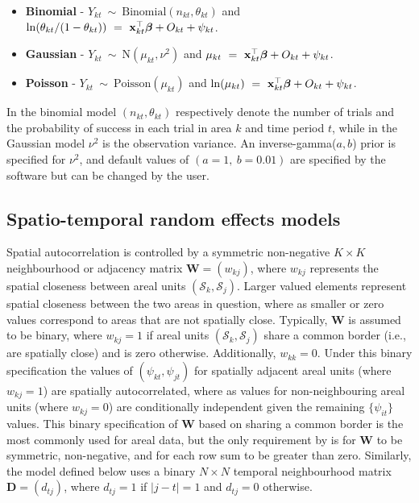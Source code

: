 \documentclass[article, nojss]{jss}
\newcommand{\bd}[1]{\ensuremath{\mbox{\boldmath $#1$}}}
\begin{document}
\begin{itemize}
\item \textbf{Binomial} -  $Y_{kt}~\sim~\mbox{Binomial}(n_{kt}, \theta_{kt})$ and $\ln(\theta_{kt}/(1-\theta_{kt}))~=~\mathbf{x}_{kt}^{\top}\bd{\beta} + O_{kt} + \psi_{kt}$. 

\item \textbf{Gaussian} -  $Y_{kt}~\sim~\mbox{N}(\mu_{kt}, \nu^{2})$ and $\mu_{kt}~=~\mathbf{x}_{kt}^{\top}\bd{\beta} + O_{kt} + \psi_{kt}$. 

\item \textbf{Poisson} -  $Y_{kt}~\sim~\mbox{Poisson}(\mu_{kt})$ and $\ln(\mu_{kt})~=~\mathbf{x}_{kt}^{\top}\bd{\beta} + O_{kt} + \psi_{kt}$. 
\end{itemize}

In the binomial model $(n_{kt}, \theta_{kt})$ respectively denote the number of trials and the probability of success in each trial in area $k$ and time period $t$, while in the Gaussian model $\nu^2$ is the observation variance. An inverse-gamma($a,b$) prior is specified for $\nu^2$, and default values of $(a=1,~ b=0.01)$  are specified by the software but can be changed by the user.


\subsection{Spatio-temporal random effects models}\label{section2.2}
Spatial autocorrelation is controlled by a symmetric non-negative $K\times K$ neighbourhood or adjacency matrix $\mathbf{W}=(w_{kj})$, where $w_{kj}$ represents the spatial closeness between areal units $(\mathcal{S}_k, \mathcal{S}_j)$. Larger valued elements represent spatial closeness between the two areas in question, where as smaller or zero values correspond to areas that are not spatially close. Typically, $\mathbf{W}$ is assumed to be binary, where $w_{kj}=1$ if areal units $(\mathcal{S}_k, \mathcal{S}_j)$ share a common border (i.e., are spatially close) and is zero otherwise. Additionally, $w_{kk}=0$. Under this binary specification the values of $(\psi_{kt}, \psi_{jt})$ for spatially adjacent areal units (where $w_{kj}=1$) are spatially autocorrelated, where as values for non-neighbouring areal units (where $w_{kj}=0$) are conditionally independent given the remaining $\{\psi_{it}\}$ values. This binary specification of $\mathbf{W}$ based on sharing a common border is the most commonly used for areal data, but the only requirement by  is for $\mathbf{W}$ to be symmetric, non-negative, and for each row sum to be greater than zero. Similarly, the model  defined below uses a binary $N\times N$ temporal neighbourhood matrix $\mathbf{D}=(d_{tj})$, where $d_{tj}=1$ if $|j-t|=1$ and $d_{tj}=0$ otherwise.\\ 
\end{document}
